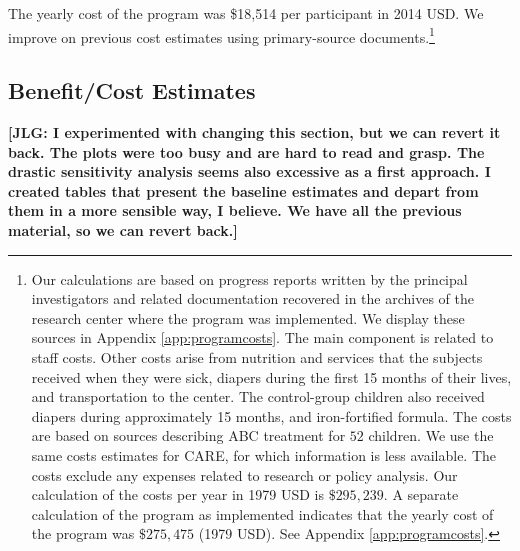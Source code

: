 The yearly cost of the program was \$18,514 per participant in 2014 USD. We improve on previous cost estimates using primary-source documents.\footnote{Our calculations are based on progress reports written by the principal investigators and related documentation recovered in the archives of the research center where the program was implemented. We display these sources in Appendix \ref{app:programcosts}. The main component is related to staff costs. Other costs arise from nutrition and services that the subjects received when they were sick, diapers during the first 15 months of their lives, and transportation to the center. The control-group children also received diapers during approximately 15 months, and iron-fortified formula. The costs are based on sources describing ABC treatment for $52$ children. We use the same costs estimates for CARE, for which information is less available. The costs exclude any expenses related to research or policy analysis. Our calculation of the costs per year in 1979 USD is $\$295,239$. A separate calculation of the program as implemented indicates that the yearly cost of the program was $\$275,475$ (1979 USD). See Appendix \ref{app:programcosts}.}

\subsection{Benefit/Cost Estimates}

\noindent \textbf{[JLG: I experimented with changing this section, but we can revert it back. The plots were too busy and are hard to read and grasp. The drastic sensitivity analysis seems also excessive as a first approach. I created tables that present the baseline estimates and depart from them in a more sensible way, I believe. We have all the previous material, so we can revert back.]}

